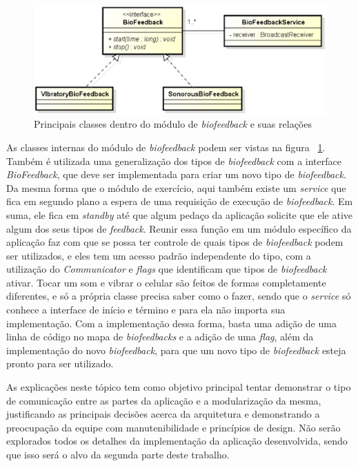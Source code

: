 \begin{figure}[!htb]
\centering
\includegraphics [keepaspectratio=true,scale=0.60]{figuras/diagramaBioFeedback.eps}
\caption{Principais classes dentro do módulo de \textit{biofeedback} e suas relações}
\label{diagramaBioFeedback}
\end{figure}

As classes internas do módulo de \textit{biofeedback} podem ser vistas na figura ~\ref{diagramaBioFeedback}. Também é utilizada uma generalização dos tipos de \textit{biofeedback} com a interface \textit{BioFeedback}, que deve ser implementada para criar um novo tipo de \textit{biofeedback}. Da mesma forma que o módulo de exercício, aqui também existe um \textit{service} que fica em segundo plano a espera de uma requisição de execução de \textit{biofeedback}. Em suma, ele fica em \textit{standby} até que algum pedaço da aplicação solicite que ele ative algum dos seus tipos de \textit{feedback}. Reunir essa função em um módulo específico da aplicação faz com que se possa ter controle de quais tipos de \textit{biofeedback} podem ser utilizados, e eles tem um acesso padrão independente do tipo, com a utilização do \textit{Communicator} e \textit{flags} que identificam que tipos de \textit{biofeedback} ativar. Tocar um som e vibrar o celular são feitos de formas completamente diferentes, e só a própria classe precisa saber como o fazer, sendo que o \textit{service} só conhece a interface de início e término e para ela não importa sua implementação. Com a implementação dessa forma, basta uma adição de uma linha de código no mapa de \textit{biofeedbacks} e a adição de uma \textit{flag}, além da implementação do novo \textit{biofeedback}, para que um novo tipo de \textit{biofeedback} esteja pronto para ser utilizado.

As explicações neste tópico tem como objetivo principal tentar demonstrar o tipo de comunicação entre as partes da aplicação e a modularização  da mesma, justificando as principais decisões acerca da arquitetura e demonstrando a preocupação da equipe com manutenibilidade e princípios de design. Não serão explorados todos os detalhes da implementação da aplicação desenvolvida, sendo que isso será o alvo da segunda parte deste trabalho.